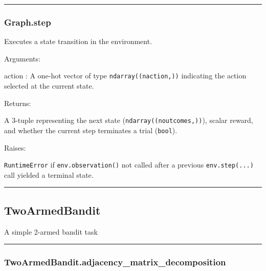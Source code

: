 \begin{center}\rule{0.5\linewidth}{\linethickness}\end{center}

\subsubsection{Graph.step}\label{graph.step}

\begin{Shaded}
\begin{Highlighting}[]
\end{Highlighting}
\end{Shaded}

Executes a state transition in the environment.

Arguments:

action : A one-hot vector of type \texttt{ndarray((naction,))}
indicating the action selected at the current state.

Returns:

A 3-tuple representing the next state (\texttt{ndarray((noutcomes,))}),
scalar reward, and whether the current step terminates a trial
(\texttt{bool}).

Raises:

\texttt{RuntimeError} if \texttt{env.observation()} not called after a
previous \texttt{env.step(...)} call yielded a terminal state.

\begin{center}\rule{0.5\linewidth}{\linethickness}\end{center}

\subsection{TwoArmedBandit}\label{twoarmedbandit}

\begin{Shaded}
\begin{Highlighting}[]
\end{Highlighting}
\end{Shaded}

A simple 2-armed bandit task

\begin{center}\rule{0.5\linewidth}{\linethickness}\end{center}

\subsubsection{TwoArmedBandit.adjacency\_matrix\_decomposition}\label{twoarmedbandit.adjacency_matrix_decomposition}

